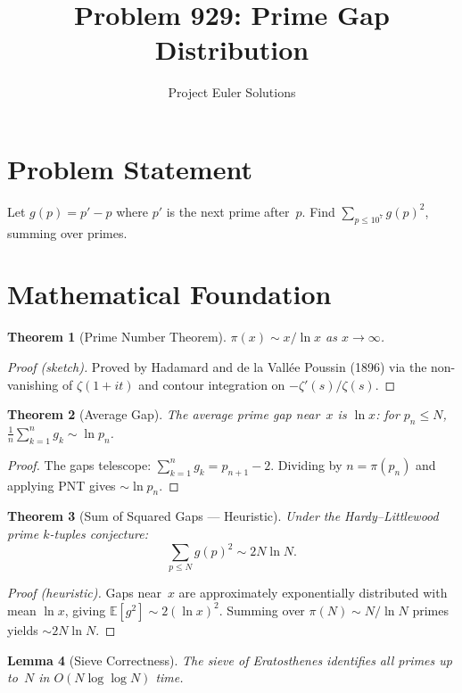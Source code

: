 \documentclass[11pt]{article}
\title{Problem 929: Prime Gap Distribution}
\author{Project Euler Solutions}
\date{}
\newtheorem{theorem}{Theorem}
\newtheorem{lemma}[theorem]{Lemma}
\theoremstyle{definition}
\begin{document}
\maketitle

\section{Problem Statement}

Let $g(p) = p' - p$ where $p'$ is the next prime after~$p$. Find $\sum_{p \leq 10^7} g(p)^2$, summing over primes.

\section{Mathematical Foundation}

\begin{theorem}[Prime Number Theorem]
$\pi(x) \sim x/\ln x$ as $x \to \infty$.
\end{theorem}

\begin{proof}[Proof (sketch)]
Proved by Hadamard and de la Vall\'ee Poussin (1896) via the non-vanishing of $\zeta(1+it)$ and contour integration on $-\zeta'(s)/\zeta(s)$.
\end{proof}

\begin{theorem}[Average Gap]
The average prime gap near~$x$ is $\ln x$: for $p_n \leq N$, $\frac{1}{n}\sum_{k=1}^n g_k \sim \ln p_n$.
\end{theorem}

\begin{proof}
The gaps telescope: $\sum_{k=1}^n g_k = p_{n+1} - 2$. Dividing by $n = \pi(p_n)$ and applying PNT gives $\sim \ln p_n$.
\end{proof}

\begin{theorem}[Sum of Squared Gaps --- Heuristic]
Under the Hardy--Littlewood prime $k$-tuples conjecture:
\[
\sum_{p \leq N} g(p)^2 \sim 2N\ln N.
\]
\end{theorem}

\begin{proof}[Proof (heuristic)]
Gaps near~$x$ are approximately exponentially distributed with mean $\ln x$, giving $\mathbb{E}[g^2] \sim 2(\ln x)^2$. Summing over $\pi(N) \sim N/\ln N$ primes yields $\sim 2N\ln N$.
\end{proof}

\begin{lemma}[Sieve Correctness]
The sieve of Eratosthenes identifies all primes up to~$N$ in $O(N\log\log N)$ time.
\end{lemma}
\end{document}
